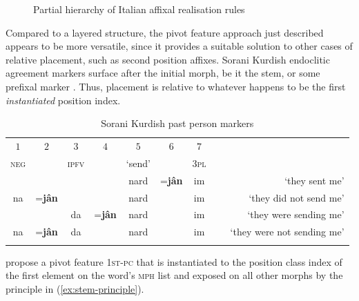 \documentclass[output=paper
	        ,collection
	        ,collectionchapter
 	        ,biblatex
                ,babelshorthands
                ,newtxmath
                ,draftmode
                ,colorlinks, citecolor=brown
]{langscibook}
\begin{document}
\begin{exe}
\begin{xlist}
\begin{exe}
\begin{xlist}
\begin{figure}[htb]
  \caption{Partial hierarchy of Italian affixal realisation rules}
  \label{fig:ItalianAff}
\end{figure}



Compared to a layered structure, the pivot feature approach just
described appears to be more versatile, since it provides a suitable
solution to other cases of relative placement, such as second position
affixes. Sorani Kurdish endoclitic agreement markers surface after the
initial morph, be it the stem, or some prefixal marker
\citep{Samvelian07}. Thus, placement is relative to whatever happens
to be the first \textit{instantiated} position index.

\begin{table}
\begin{center}
{\small
\begin{tabular}[t]{ccccccc|lr}
\lsptoprule
$1$ & $2$ & $3$ & $4$ & $5$ & $6$ & $7$ &\\
\textsc{neg} & & \textsc{ipfv} & & `send' & & \textsc{3pl}\\   
\midrule
    &&      && nard &=\textbf{jân} & im & ~ &{`they sent me'}\\
na & =\textbf{jân}     &  & & nard & & im & ~ &{`they did not send me'}\\
   & & da & =\textbf{jân} & nard & & im & ~ &{`they were sending me'}\\
na & =\textbf{jân}     &  da  & & nard & & im & ~ & {`they were not sending me'}\\
\lspbottomrule
\end{tabular}
}
\end{center}
\caption{Sorani Kurdish past person markers\label{table-kurdish}}
\label{tab:Sorani}
\end{table}

\citet{bonami_o-crysmann_b13hpsg} propose a pivot feature \textsc{1st-pc} that is
instantiated to the position class index of the first element on the
word's \textsc{mph} list and exposed on all other morphs by the
principle in (\ref{ex:stem-principle}).

\begin{exe}
  \ex\label{ex:stem-principle}
\end{exe}


\end{xlist}
\end{exe}
\end{xlist}
\end{exe}
\end{document}

